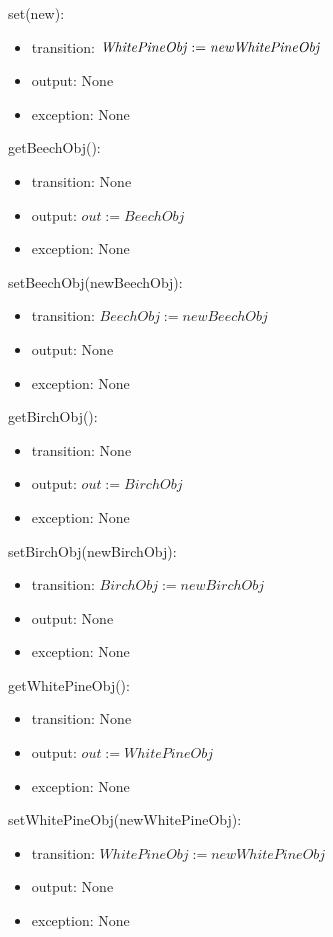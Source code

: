 \documentclass[12pt, titlepage]{article}
\begin{document}
\noindent set\attr(new\attr):
\begin{itemize}
\item transition: $\mathit{\attr := new\attr}$
\item output: None
\item exception: None
\end{itemize}


\renewcommand{\attr}{BeechObj}
\noindent get\attr():
\begin{itemize}
\item transition: None
\item output: $\mathit{out := \attr}$
\item exception: None
\end{itemize}

\noindent set\attr(new\attr):
\begin{itemize}
\item transition: $\mathit{\attr := new\attr}$
\item output: None
\item exception: None
\end{itemize}

\renewcommand{\attr}{BirchObj}
\noindent get\attr():
\begin{itemize}
\item transition: None
\item output: $\mathit{out := \attr}$
\item exception: None
\end{itemize}

\noindent set\attr(new\attr):
\begin{itemize}
\item transition: $\mathit{\attr := new\attr}$
\item output: None
\item exception: None
\end{itemize}


\renewcommand{\attr}{WhitePineObj}
\noindent get\attr():
\begin{itemize}
\item transition: None
\item output: $\mathit{out := \attr}$
\item exception: None
\end{itemize}

\noindent set\attr(new\attr):
\begin{itemize}
\item transition: $\mathit{\attr := new\attr}$
\item output: None
\item exception: None
\end{itemize}
\end{document}
